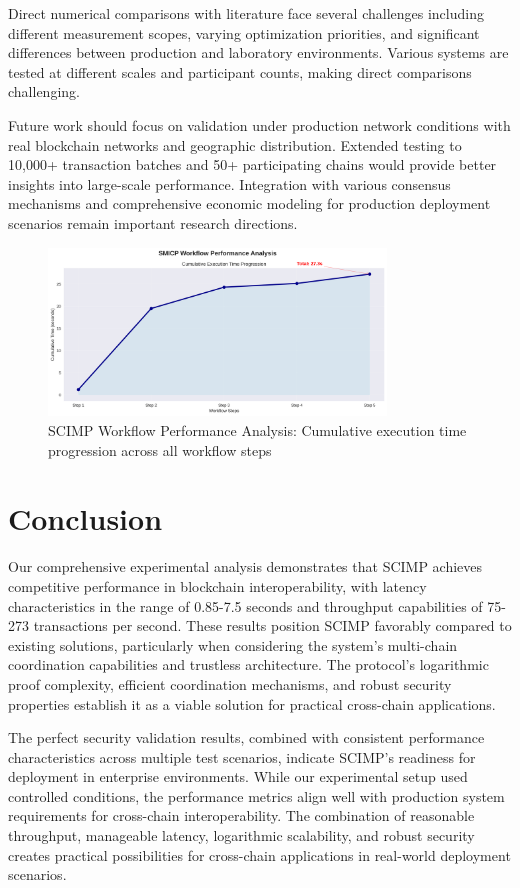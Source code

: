 Direct numerical comparisons with literature face several challenges including different measurement scopes, varying optimization priorities, and significant differences between production and laboratory environments. Various systems are tested at different scales and participant counts, making direct comparisons challenging.

Future work should focus on validation under production network conditions with real blockchain networks and geographic distribution. Extended testing to 10,000+ transaction batches and 50+ participating chains would provide better insights into large-scale performance. Integration with various consensus mechanisms and comprehensive economic modeling for production deployment scenarios remain important research directions.

\begin{figure}[h]
\centering
\includegraphics[width=0.8\textwidth]{Images/workflow_analysis.png}
\caption{SCIMP Workflow Performance Analysis: Cumulative execution time progression across all workflow steps}
\label{fig:workflow-analysis}
\end{figure}

\section{Conclusion}

Our comprehensive experimental analysis demonstrates that SCIMP achieves competitive performance in blockchain interoperability, with latency characteristics in the range of 0.85-7.5 seconds and throughput capabilities of 75-273 transactions per second. These results position SCIMP favorably compared to existing solutions, particularly when considering the system's multi-chain coordination capabilities and trustless architecture. The protocol's logarithmic proof complexity, efficient coordination mechanisms, and robust security properties establish it as a viable solution for practical cross-chain applications.

The perfect security validation results, combined with consistent performance characteristics across multiple test scenarios, indicate SCIMP's readiness for deployment in enterprise environments. While our experimental setup used controlled conditions, the performance metrics align well with production system requirements for cross-chain interoperability. The combination of reasonable throughput, manageable latency, logarithmic scalability, and robust security creates practical possibilities for cross-chain applications in real-world deployment scenarios.